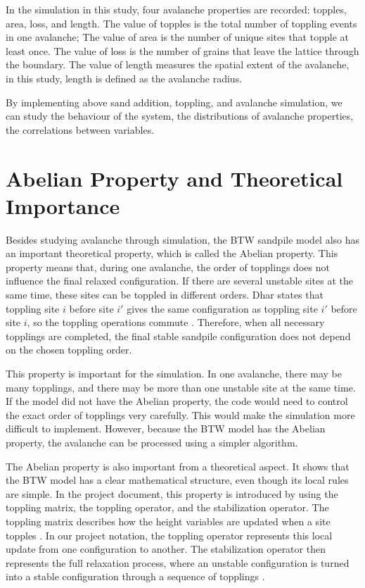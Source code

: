 In the simulation in this study, four avalanche properties are recorded: topples, area, loss, and length. The value of topples is the total number of toppling events in one avalanche; The value of area is the number of unique sites that topple at least once. The value of loss is the number of grains that leave the lattice through the boundary. The value of length measures the spatial extent of the avalanche, in this study, length is defined as the avalanche radius. 

By implementing above sand addition, toppling, and avalanche simulation, we can study the behaviour of the system, the distributions of avalanche properties, the correlations between variables. 



\section{Abelian Property and Theoretical Importance}

Besides studying avalanche through simulation, the BTW sandpile model also has an important theoretical property, which is called the Abelian property. This property means that, during one avalanche, the order of topplings does not influence the final relaxed configuration. If there are several unstable sites at the same time, these sites can be toppled in different orders. Dhar states that toppling site $i$ before site $i'$ gives the same configuration as toppling site $i'$ before site $i$, so the toppling operations commute \citep{DHAR1999}. Therefore, when all necessary topplings are completed, the final stable sandpile configuration does not depend on the chosen toppling order.

This property is important for the simulation. In one avalanche, there may be many topplings, and there may be more than one unstable site at the same time. If the model did not have the Abelian property, the code would need to control the exact order of topplings very carefully. This would make the simulation more difficult to implement. However, because the BTW model has the Abelian property, the avalanche can be processed using a simpler algorithm.

The Abelian property is also important from a theoretical aspect. It shows that the BTW model has a clear mathematical structure, even though its local rules are simple. In the project document, this property is introduced by using the toppling matrix, the toppling operator, and the stabilization operator. The toppling matrix describes how the height variables are updated when a site topples \citep{DHAR1999}. In our project notation, the toppling operator represents this local update from one configuration to another. The stabilization operator then represents the full relaxation process, where an unstable configuration is turned into a stable configuration through a sequence of topplings \citep{DHAR1999}.

